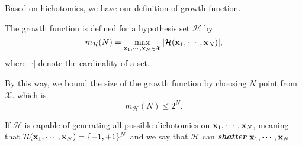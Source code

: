 Based on hichotomies, we have our definition of growth function.
\begin{mydef}
    The growth function is defined for a hypothesis set $\mathcal{H}$ by 
    \begin{equation}
        m_{\mathcal{H}}(N) = \max_{\bf{x}_1, \cdots, \bf{x}_N \in \mathcal{X}} |\mathcal{H}(\bf{x}_1, \cdots, \bf{x}_N)|,
    \end{equation}
    where $|\cdot|$ denote the cardinality of a set.
\end{mydef}

By this way, we bound the size of the growth function by choosing $N$ point from $\mathcal{X}$. 
which is 
\begin{equation}
    m_{\mathcal{H}}(N) \le 2^N.
\end{equation}

If $\mathcal{H}$ is capable of generating all possible dichotomies on $\bf{x}_1, \cdots, \bf{x}_N$,
meaning that $\mathcal{H}(\bf{x}_1, \cdots, \bf{x}_N) = \{-1, +1\}^N$ 
and we say that $\mathcal{H}$ can \bf{\it{shatter}} $\bf{x}_1, \cdots, \bf{x}_N$







